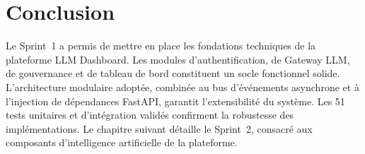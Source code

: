 \section*{Conclusion}

Le Sprint~1 a permis de mettre en place les fondations techniques de la plateforme LLM Dashboard. Les modules d'authentification, de Gateway LLM, de gouvernance et de tableau de bord constituent un socle fonctionnel solide. L'architecture modulaire adoptée, combinée au bus d'événements asynchrone et à l'injection de dépendances FastAPI, garantit l'extensibilité du système. Les 51 tests unitaires et d'intégration validés confirment la robustesse des implémentations. Le chapitre suivant détaille le Sprint~2, consacré aux composants d'intelligence artificielle de la plateforme.
